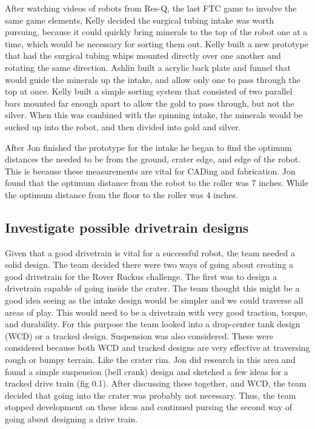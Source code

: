 \documentclass{article}
\begin{document}
After watching videos of robots from Res-Q, the last FTC game to involve the same game elements, Kelly decided the surgical tubing intake was worth pursuing, because it could quickly bring minerals to the top of the robot one at a time, which would be necessary for sorting them out. Kelly built a new prototype that had the surgical tubing whips mounted directly over one another and rotating the same direction. Ashlin built a acrylic back plate and funnel that would guide the minerals up the intake, and allow only one to pass through the top at once. Kelly built a simple sorting system that consisted of two parallel bars mounted far enough apart to allow the gold to pass through, but not the silver. When this was combined with the spinning intake, the minerals would be sucked up into the robot, and then divided into gold and silver. 

After Jon finished the prototype for the intake he began to find the optimum distances the needed to be from the ground, crater edge, and edge of the robot. This is because these measurements are vital for CADing and fabrication. Jon found that the optimum distance from the robot to the roller was 7 inches. While the optimum distance from the floor to the roller was 4 inches. 




\subsection{Investigate possible drivetrain designs}
Given that a good drivetrain is vital for a successful robot, the team needed a solid design. The team decided there were two ways of going about creating a good drivetrain for the Rover Ruckus challenge. The first was to design a drivetrain capable of going inside the crater. The team thought this might be a good idea seeing as the intake design would be simpler and we could traverse all areas of play. This would need to be a drivetrain with very good traction, torque, and durability. For this purpose the team looked into a drop-center tank design (WCD) or a tracked design. Suspension was also considered. These were considered because both WCD and tracked designs are very effective at traversing rough or bumpy terrain. Like the crater rim. Jon did research in this area and found a simple suspension (bell crank) design and sketched a few ideas for a tracked drive train (fig 0.1). After discussing these together, and WCD, the team decided that going into the crater was probably not necessary. Thus, the team stopped development on these ideas and continued pursing the second way of going about designing a drive train.
\end{document}
